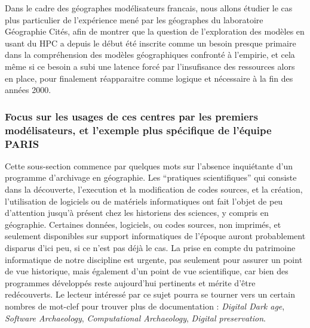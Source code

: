 Dans le cadre des géographes modélisateurs francais, nous allons étudier le cas plus particulier de l'expérience mené par les géographes du laboratoire Géographie Cités, afin de montrer que la question de l'exploration des modèles en usant du HPC a depuis le début été inscrite comme un besoin presque primaire dans la compréhension des modèles géographiques confronté à l'empirie, et cela même si ce besoin a subi une latence forcé par l'insufisance des ressources alors en place, pour finalement réapparaitre comme logique et nécessaire à la fin des années 2000.




\subsubsection{Focus sur les usages de ces centres par les premiers modélisateurs, et l'exemple plus spécifique de l'équipe PARIS}
\label{sssec:contexte_modelisateur}

Cette sous-section commence par quelques mots sur l'absence inquiétante d'un programme d'archivage en géographie. Les \enquote{pratiques scientifiques} qui consiste dans la découverte, l’execution et la modification de codes sources, et la création, l'utilisation de logiciels ou de matériels informatiques ont fait l'objet de peu d'attention jusqu'à présent chez les historiens des sciences, y compris en géographie. Certaines données, logiciels, ou codes sources, non imprimés, et seulement disponibles sur support informatiques de l'époque auront probablement disparus d'ici peu, si ce n'est pas déjà le cas. La prise en compte du patrimoine informatique de notre discipline est urgente, pas seulement pour assurer un point de vue historique, mais également d'un point de vue scientifique, car bien des programmes développés reste aujourd'hui pertinents et mérite d'être redécouverts. Le lecteur intéressé par ce sujet pourra se tourner vers un certain nombres de mot-clef pour trouver plus de documentation : \textit{Digital Dark age}, \textit{Software Archaeology}, \textit{Computational Archaeology}, \textit{Digital preservation}.

